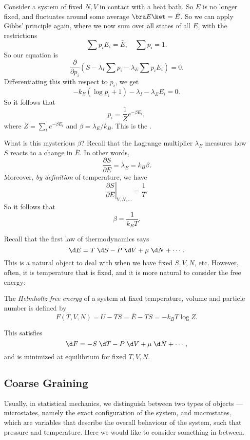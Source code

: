 \documentclass[a4paper]{article}
\begin{document}
\begin{eg}
  Consider a system of fixed $N, V$ in contact with a heat bath. So $E$ is no longer fixed, and fluctuates around some average $\bra E \ket = \bar{E}$. So we can apply Gibbs' principle again, where we now sum over all states of all $E$, with the restrictions
  \[
    \sum p_i E_i = \bar{E},\quad \sum p_i = 1.
  \]
  So our equation is
  \[
    \frac{\partial}{\partial p_i} \left(S - \lambda_I \sum p_i - \lambda_E \sum p_i E_i\right) = 0.
  \]
  Differentiating this with respect to $p_i$, we get
  \[
     -k_B (\log p_i + 1) - \lambda_I - \lambda_E E_i = 0.
  \]
  So it follows that
  \[
    p_i = \frac{1}{Z} e^{-\beta E_i},
  \]
  where $Z = \sum_i e^{-\beta E_i}$ and $\beta = \lambda_E/k_B$. This is the .

  What is this mysterious $\beta$? Recall that the Lagrange multiplier $\lambda_E$ measures how $S$ reacts to a change in $\bar{E}$. In other words,
   \[
    \frac{\partial S}{\partial E} = \lambda_E = k_B \beta.
  \]
  Moreover, \emph{by definition} of temperature, we have
  \[
    \left.\frac{\partial S}{\partial E}\right|_{V, N, \ldots} = \frac{1}{T}.
  \]
  So it follows that
  \[
    \beta = \frac{1}{k_B T}.
  \]
\end{eg}

Recall that the first law of thermodynamics says
\[
  \d E = T\;\d S - P \;\d V + \mu \;\d N + \cdots.
\]
This is a natural object to deal with when we have fixed $S, V, N$, etc. However, often, it is temperature that is fixed, and it is more natural to consider the free energy:
\begin{defi}
  The \emph{Helmholtz free energy} of a system at fixed temperature, volume and particle number is defined by
  \[
    F(T, V, N) = U - TS = \bar{E} - TS = - k_B T \log Z.
  \]
\end{defi}
This satisfies
\[
  \d F = -S \;\d T - P\;\d V + \mu\;\d N + \cdots,
\]
and is minimized at equilibrium for fixed $T, V, N$. %

\subsection{Coarse Graining}
Usually, in statistical mechanics, we distinguish between two types of objects --- microstates, namely the exact configuration of the system, and macrostates, which are variables that describe the overall behaviour of the system, such that pressure and temperature. Here we would like to consider something in between.
\end{document}

